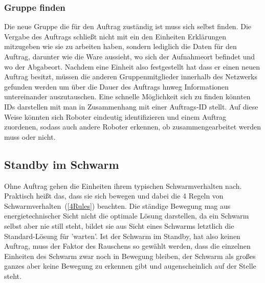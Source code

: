 \subsubsection*{Gruppe finden}
Die neue Gruppe die für den Auftrag zuständig ist muss sich selbst finden.
Die Vergabe des Auftrags schließt nicht mit ein den Einheiten Erklärungen mitzugeben wie sie zu arbeiten haben, sondern lediglich die Daten für den Auftrag, darunter wie die Ware aussieht, wo sich der Aufnahmeort befindet und wo der Abgabeort.
Nachdem eine Einheit also festgestellt hat dass er einen neuen Auftrag besitzt, müssen die anderen Gruppenmitglieder innerhalb des Netzwerks gefunden werden um über die Dauer des Auftrags hnweg Informationen untereinander auszutauschen.
Eine schnelle Möglichkeit sich zu finden könnten IDs darstellen mit man in Zusammenhang mit einer Auftrags-ID stellt. Auf diese Weise könnten sich Roboter eindeutig identifizieren und einem Auftrag zuordenen, sodass auch andere Roboter erkennen, ob zusammengearbeitet werden muss oder nicht.

\subsection*{Standby im Schwarm}\label{subsec:StandbyImSchwarm}
Ohne Auftrag gehen die Einheiten ihrem typischen Schwarmverhalten nach. Praktisch heißt das, dass sie sich bewegen und dabei die 4 Regeln von Schwarmverhalten~(\autoref{4Rules}) beachten.
Die ständige Bewegung mag aus energietechnischer Sicht nicht die optimale Lösung darstellen, da ein Schwarm selbst aber nie still steht, bildet sie aus Sicht eines Schwarms letztlich die Standard-Lösung für 'warten'.
Ist der Schwarm im Standby, hat also keinen Auftrag, muss der Faktor des Rauschens so gewählt werden, dass die einzelnen Einheiten des Schwarm zwar noch in Bewegung bleiben, der Schwarm als großes ganzes aber keine Bewegung zu erkennen gibt und augenscheinlich auf der Stelle steht.

